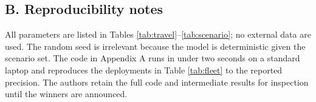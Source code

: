 \documentclass{apmcmthesis}
\begin{document}
\subsection*{B. Reproducibility notes}

All parameters are listed in Tables \ref{tab:travel}--\ref{tab:scenario}; no external data are used. The random seed is irrelevant because the model is deterministic given the scenario set. The code in Appendix A runs in under two seconds on a standard laptop and reproduces the deployments in Table \ref{tab:fleet} to the reported precision. The authors retain the full code and intermediate results for inspection until the winners are announced.
\end{document}
